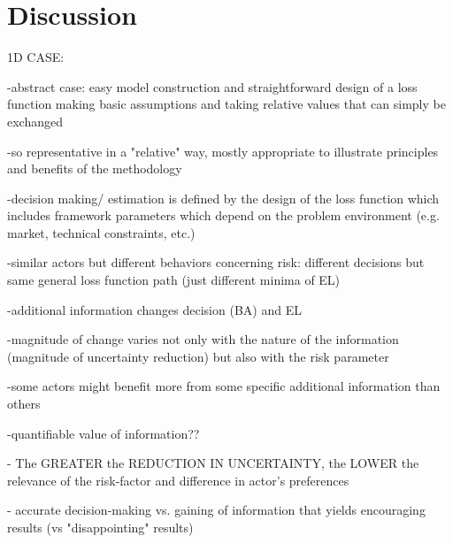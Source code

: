 	\chapter{Discussion}\label{cha:discussion}
	
	1D CASE:
	
				-abstract case: easy model construction and straightforward design of a loss function making basic assumptions and taking relative values that can simply be exchanged
			
				-so representative in a "relative" way, mostly appropriate to illustrate principles and benefits of the methodology
				
				-decision making/ estimation is defined by the design of the loss function which includes framework parameters which depend on the problem environment (e.g. market, technical constraints, etc.)
			
				-similar actors but different behaviors concerning risk: different decisions but same general loss function path (just different minima of EL)
			
				-additional information changes decision (BA) and EL
			
				-magnitude of change varies not only with the nature of the information (magnitude of uncertainty reduction) but also with the risk parameter
			
				-some actors might benefit more from some specific additional information than others
			
				-quantifiable value of information??
				
				
				
				
				- The GREATER the REDUCTION IN UNCERTAINTY, the LOWER the relevance of the risk-factor and difference in actor's preferences
				
				- accurate decision-making vs. gaining of information that yields encouraging results (vs "disappointing" results)